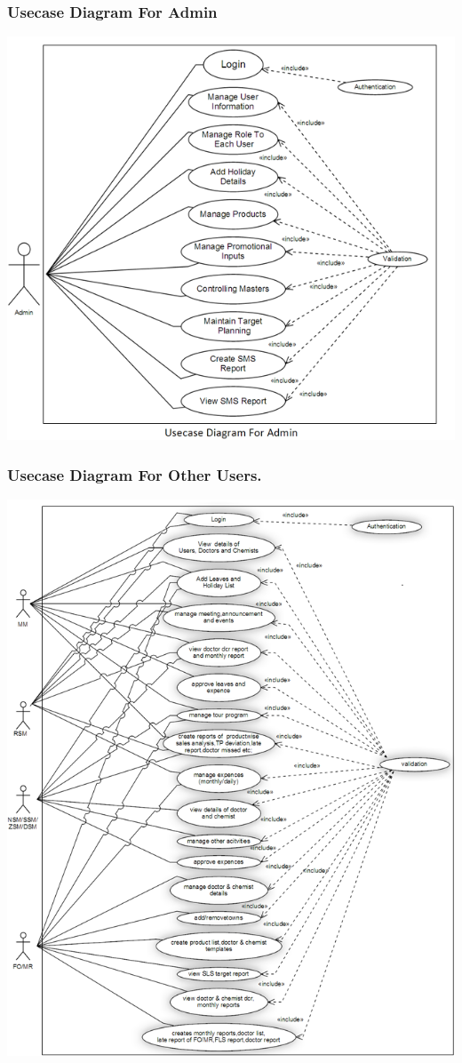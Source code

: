\subsubsection{Usecase Diagram For Admin}
\includegraphics[scale=0.7]{Diag/usecaseadmin.png}

\label{fig:Use case diagram For Admin}
\subsubsection{Usecase Diagram For Other Users.}
\includegraphics[scale=0.8]{Diag/usecaseall.png}

